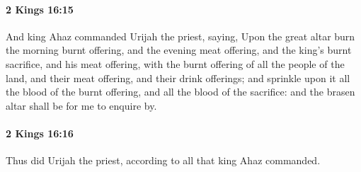 		\paragraph{2 Kings 16:15} %
			\label{2KINGS-16-15}

			And king Ahaz commanded Urijah the priest, saying, Upon the great altar burn the morning burnt offering, and the evening meat offering, and the king’s burnt sacrifice, and his meat offering, with the burnt offering of all the people of the land, and their meat offering, and their drink offerings; and sprinkle upon it all the blood of the burnt offering, and all the blood of the sacrifice: and the brasen altar shall be for me to enquire by.


		\paragraph{2 Kings 16:16} %
			\label{2KINGS-16-16}

			Thus did Urijah the priest, according to all that king Ahaz commanded.

